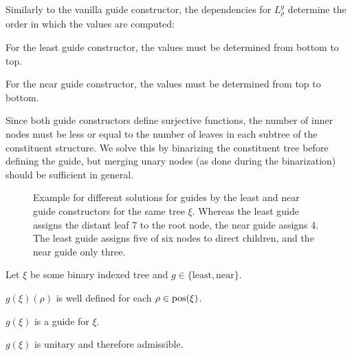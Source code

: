 \documentclass[../../document.tex]{subfiles}
\begin{document}
    Similarly to the vanilla guide constructor, the dependencies for \(L^g_\rho\) determine the order in which the values are computed:
    \begin{inparaenum}
        \item For the least guide constructor, the values must be determined from bottom to top.
        \item For the near guide constructor, the values must be determined from top to bottom.
    \end{inparaenum}
    Since both guide constructors define surjective functions, the number of inner nodes must be less or equal to the number of leaves in each subtree of the constituent structure.
    We solve this by binarizing the constituent tree before defining the guide, but merging unary nodes (as done during the binarization) should be sufficient in general.

    \begin{figure}
        \null\hfill
        \begin{minipage}{.35\linewidth}
            \centering
            
        \end{minipage}
        \hfill
        \begin{minipage}{.35\linewidth}
            \centering
            
        \end{minipage}
        \hfill\null
        \caption{\label{fig:guides:diff}
            Example for different solutions for guides by the least and near guide constructors for the same tree \(\xi\).
            Whereas the least guide assigns the distant leaf 7 to the root node, the near guide assigns 4.
            The least guide assigns five of six nodes to direct children, and the near guide only three.
        }
    \end{figure}

    \begin{claim}
        Let \(\xi\) be some binary indexed tree and \(g \in \{\mathrm{least}, \mathrm{near}\}\).
        \begin{compactenum}
            \item \(g(\xi)(\rho)\) is well defined for each \(\rho \in \operatorname{pos}(\xi)\).
            \item \(g(\xi)\) is a guide for \(\xi\).
            \item \(g(\xi)\) is unitary and therefore admissible.
        \end{compactenum}
    \end{claim}
\end{document}
